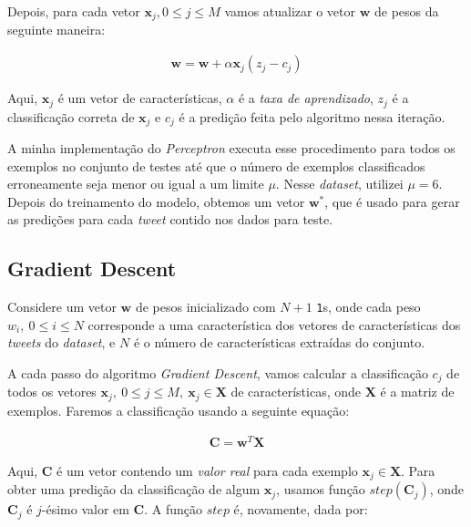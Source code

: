 \documentclass[a4paper, 12pt]{article}
\begin{document}
Depois, para cada vetor $\boldsymbol{x}_j, 0 \leq j \leq M$ vamos atualizar o vetor
$\boldsymbol{w}$ de pesos da seguinte maneira:

\begin{align*}
    \boldsymbol{w} = \boldsymbol{w} + \alpha\boldsymbol{x}_j(z_j - c_j)
\end{align*}

Aqui, $\boldsymbol{x}_j$ é um vetor de características, $\alpha$ é a
\textit{taxa de aprendizado}, $z_j$ é a classificação correta de
$\boldsymbol{x}_j$ e $c_j$ é a predição feita pelo algoritmo nessa iteração.

A minha implementação do \textit{Perceptron} executa esse procedimento para
todos os exemplos no conjunto de testes até que o número de exemplos
classificados erroneamente seja menor ou igual a um limite $\mu$. Nesse
\textit{dataset}, utilizei $\mu = 6$. Depois do treinamento do modelo, obtemos
um vetor $\boldsymbol{w}^{*}$, que é usado para gerar as predições para cada \textit{tweet}
contido nos dados para teste.

\subsection{Gradient Descent} \label{sec:gd}

Considere um vetor $\boldsymbol{w}$ de pesos inicializado
com $N + 1$ \texttt{1}s, onde cada peso $w_i,\: 0 \leq i \leq N$
corresponde a uma característica dos vetores de características
dos \textit{tweets} do \textit{dataset}, e $N$ é o número
de características extraídas do conjunto.

A cada passo do algoritmo \textit{Gradient Descent}, vamos calcular a
classificação $c_j$ de todos os vetores $\boldsymbol{x}_j,\: 0 \leq j \leq M,\: \boldsymbol{x}_j \in
\boldsymbol{X}$ de características, onde $\boldsymbol{X}$ é a matriz
de exemplos. Faremos a classificação usando a seguinte equação:

\begin{align*}
    \boldsymbol{C} = \boldsymbol{w}^{T}\boldsymbol{X}
\end{align*}

Aqui, $\boldsymbol{C}$ é um vetor contendo um \textit{valor real} para
cada exemplo $\boldsymbol{x}_j \in \boldsymbol{X}$. Para obter uma predição
da classificação de algum $\boldsymbol{x}_j$, usamos função $step(\boldsymbol{C}_j)$,
onde $\boldsymbol{C}_j$ é $j$-ésimo valor em $\boldsymbol{C}$. A função $step$
é, novamente, dada por:
\end{document}
